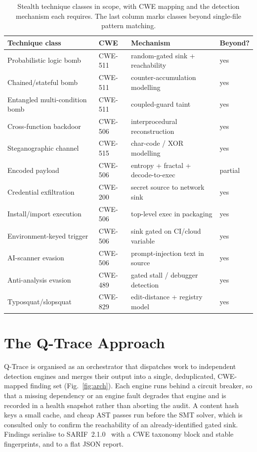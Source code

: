 \documentclass[runningheads]{llncs}
\begin{document}
\begin{table}[t]
\centering
\caption{Stealth technique classes in scope, with CWE mapping and the detection
mechanism each requires. The last column marks classes beyond single-file pattern
matching.}
\label{tab:threats}
\footnotesize
\begin{tabular}{@{}llll@{}}
\toprule
\textbf{Technique class} & \textbf{CWE} & \textbf{Mechanism} & \textbf{Beyond?}\\
\midrule
Probabilistic logic bomb & CWE-511 & random-gated sink + reachability & yes\\
Chained/stateful bomb & CWE-511 & counter-accumulation modelling & yes\\
Entangled multi-condition bomb & CWE-511 & coupled-guard taint & yes\\
Cross-function backdoor & CWE-506 & interprocedural reconstruction & yes\\
Steganographic channel & CWE-515 & char-code / XOR modelling & yes\\
Encoded payload & CWE-506 & entropy + fractal + decode-to-exec & partial\\
Credential exfiltration & CWE-200 & secret source to network sink & yes\\
Install/import execution & CWE-506 & top-level exec in packaging & yes\\
Environment-keyed trigger & CWE-506 & sink gated on CI/cloud variable & yes\\
AI-scanner evasion & CWE-506 & prompt-injection text in source & yes\\
Anti-analysis evasion & CWE-489 & gated stall / debugger detection & yes\\
Typosquat/slopsquat & CWE-829 & edit-distance + registry model & yes\\
\bottomrule
\end{tabular}
\end{table}

\section{The Q-Trace Approach}\label{sec:approach}
Q-Trace is organised as an orchestrator that dispatches work to independent
detection engines and merges their output into a single, deduplicated, CWE-mapped
finding set (Fig.~\ref{fig:arch}). Each engine runs behind a circuit breaker, so
that a missing dependency or an engine fault degrades that engine and is recorded
in a health snapshot rather than aborting the audit. A content hash keys a small
cache, and cheap AST passes run before the SMT solver, which is consulted only to
confirm the reachability of an already-identified gated sink. Findings serialise
to SARIF~2.1.0~\cite{sarif} with a CWE taxonomy block and stable fingerprints, and
to a flat JSON report.
\end{document}

